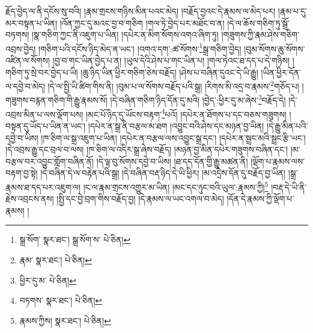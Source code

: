 རྗོད་བྱེད་ལ་ནི་དངོས་སུ་བའི། །རྣམ་གྲངས་གཉིས་མིན་པའང་མེད། །བརྗོད་བྱའང་དེ་རྣམས་ལ་མེད་པར། །རྣམ་པ་དུ་མར་བསྟན་པ་ཡིན། །འོན་ཀྱང་དུ་མའང་བྱ་བ་གཅིག །གལ་ཏེ་བྱེད་པར་མཐོང་བ་ན། །དེ་ལ་ཆོས་གཅིག་ཏུ་སྒྲོ་བཏགས། །སྣ་གཅིག་ཀྱང་ནི་འཇུག་པ་ཡིན། །དཔེར་ན་མིག་སོགས་འགའ་ཞིག་ཏུ། །གཟུགས་ཀྱི་རྣམ་ཤེས་གཅིག་འབྲས་བྱེད། །གཅིག་པའི་དངོས་ཉིད་མེད་ན་ཡང་། །འགའ་དག་:ཚ་སོགས་\footnote{སྒྲ་སོག་  སྣར་ཐང་། སྒྲ་སོག་ས་  པེ་ཅིན། }སྒྲ་གཅིག་བྱེད། །བུམ་སོགས་ཆུ་སོགས་འཛིན་ལ་སོགས། །བྱ་བ་གང་ཡིན་བྱེད་པ་ན། །ཡུལ་དེའི་ཤེས་པ་གང་ཡིན་པ། །གལ་ཏེའང་ཐ་དད་པ་དེ་གཉིས། །གཅིག་ཏུ་སྲེ་བར་བྱེད་པ་ཡི། །ཆུ་ཉིད་ཡིན་ཕྱིར་གཅིག་ཅེས་བརྗོད། །ཤེས་པ་བཞིན་དུའང་དེ་ཡི་རྒྱུ། །ཡིན་ཕྱིར་དོན་ལ་དབྱེ་བ་མེད། །དེ་ལ་སྤྱི་ཡི་ཚིག་གིས་ནི། །བུམ་པ་ལ་སོགས་བརྗོད་པའི་སྒྲ། །རིགས་མི་འདྲ་བ་རྣམས་\footnote{རྣམ་  སྣར་ཐང་།  པེ་ཅིན། }གཅོད་པ། །གཟུགས་བརྙན་གཅིག་གི་རྒྱུ་རྣམས་སོ། །དེ་བཞིན་གཅིག་ཉིད་དོན་དུ་མའི། །བྱེད་:ཕྱིར་དུ་མ་ཞེས་\footnote{ཕྱིར་དུ་མ་  པེ་ཅིན། }བརྗོད་དེ། །དེ་འབྲས་མིན་པ་ལས་ལྡོག་པས། །མང་པོ་ཉིད་དུ་ཡོངས་བརྟག་\footnote{བཏགས་  སྣར་ཐང་།  པེ་ཅིན། }པའོ། །དཔེར་ན་ཐོགས་པ་དང་བཅས་གཟུགས། །བསྟན་དུ་ཡོད་པ་ཡིན་ན་ཡང་། །དཔེར་ན་སྒྲ་ནི་བརྩལ་མ་ཐག །འབྱུང་བའི་ཤེས་དང་མཉན་བྱ་ཡིན། །དེ་རྒྱུ་མིན་པའི་དབྱེ་བ་ཡིས། །ཁ་ཅིག་ལ་སྒྲ་འཇུག་པ་ཡིན། །དཔེར་ན་བརྩལ་ལས་འབྱུང་སྒྲ་དང་། །དཔེར་ན་སྦྲང་མའི་སྦྲང་རྩི་ཡང་། །དེ་འབྲས་རྒྱུ་དང་བྲལ་བ་ལས། །ཁ་ཅིག་ལ་འདིར་སྒྲ་ཞེས་བརྗོད། །མཉན་བྱ་མིན་དཔེར་གཟུགས་བཞིན་དང་། །མ་བརྩལ་བར་འབྱུང་གློག་བཞིན་ནོ། །དེ་ལྟ་བུ་སོགས་དབྱེ་བ་ཡིས། །ཐ་དད་དོན་གྱི་རྒྱུ་མཚན་ནི། །ལྡོག་པ་རྣམས་ལས་བརྟག་བྱ་སྟེ། །དེ་བཞིན་དེ་ལ་བརྟེན་པའི་སྒྲ། །དེ་བཞིན་བརྡ་ཉིད་དེ་ཡི་ཕྱིར། །མ་འདྲེས་དོན་དུ་བརྗོད་བྱ་ཡིན། །སྒྲ་རྣམས་ཐ་དད་པར་འཇུག་ལ། །ང་ལ་རྣམ་གྲངས་འགྱུར་མ་ཡིན། །མང་དང་ཉུང་བའི་ཡུལ་:རྣམས་ཀྱི།\footnote{རྣམས་ཀྱིས།  སྣར་ཐང་།  པེ་ཅིན། } །བརྡ་དེ་ཡི་ནི་རྗེས་འབྲངས་ནས། །སྤྱི་དང་བྱེ་བྲག་གིས་བརྗོད་བྱ། །དེ་རྣམས་ལ་ཡང་འགལ་བ་མེད། །དོན་དེ་རྣམས་ཀྱི་ལྡོག་པ་རྣམས། །
